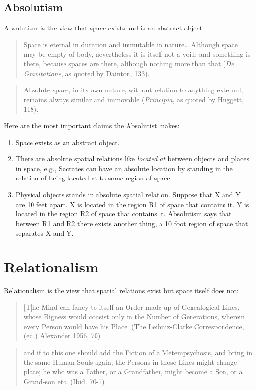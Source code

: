 \documentclass[oneside]{article}
\begin{document}
\subsection*{Absolutism}
Absolutism is the view that space exists and is an abstract object.
\begin{quote}
Space is eternal in duration and immutable in nature\ldots{} Although
space may be empty of body, nevertheless it is itself not a void: and
something is there, because spaces are there, although nothing more than
that (\emph{De Gravitatione}, as quoted by Dainton, 133).
\end{quote}

\begin{quote}
Absolute space, in its own nature, without relation to anything
external, remains always similar and immovable (\emph{Principia}, as quoted
by Huggett, 118).
\end{quote}
Here are the most important claims the Absolutist makes:
\begin{enumerate}
\item Space exists as an abstract object.
\item There are absolute spatial relations like \emph{located at} between objects and places in space, e.g., Socrates can have an absolute location by standing in the relation of being located at to some region of space. 
\item Physical objects stands in absolute spatial relation. Suppose that X and Y are 10 feet apart. X is located in the region R1 of space that contains it. Y is located in the region R2 of space that contains it. Absolutism says that between R1 and R2 there exists another thing, a 10
foot region of space that separates X and Y.
\end{enumerate}

\section*{Relationalism}
Relationalism is the view that spatial relations exist but space itself
does not:

\begin{quote}
{[}T{]}he Mind can fancy to itself an Order made up of Genealogical
Lines, whose Bigness would consist only in the Number of Generations,
wherein every Person would have his Place. (The Leibniz-Clarke
Correspondence, (ed.) Alexander 1956, 70)
\end{quote}

\begin{quote}
and if to this one should add the Fiction of a Metempsychosis, and bring
in the same Human Souls again; the Persons in those Lines might change
place; he who was a Father, or a Grandfather, might become a Son, or a
Grand-son etc. (Ibid. 70-1)
\end{quote}
\end{document}
